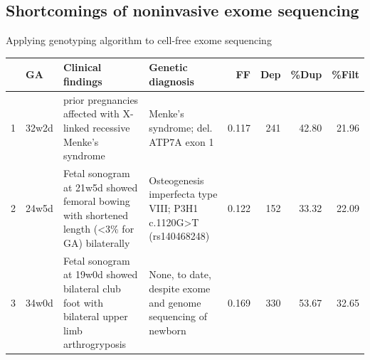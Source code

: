 \documentclass[
  10pt,
  ignorenonframetext,
  m]{beamer}
\begin{document}
\hypertarget{shortcomings-of-noninvasive-exome-sequencing}{%
\subsection{Shortcomings of noninvasive exome
sequencing}\label{shortcomings-of-noninvasive-exome-sequencing}}

\begin{frame}{Applying genotyping algorithm to cell-free exome
sequencing}
\protect\hypertarget{applying-genotyping-algorithm-to-cell-free-exome-sequencing}{}

\scriptsize

\begin{table}
\centering
\begin{tabular}[t]{ll>{\raggedright\arraybackslash}p{8em}>{\raggedright\arraybackslash}p{8em}rrrr}
\toprule
  & GA & Clinical findings & Genetic diagnosis & FF & Dep & \%Dup & \%Filt\\
\midrule
1 & 32w2d & 5 prior pregnancies affected with X-linked recessive Menke's syndrome & Menke's syndrome; del. ATP7A exon 1 & 0.117 & 241 & 42.80 & 21.96\\
2 & 24w5d & Fetal sonogram at 21w5d showed femoral bowing with shortened length (\textless3\% for GA) bilaterally & Osteogenesis imperfecta type VIII; P3H1 c.1120G\textgreater T (rs140468248) & 0.122 & 152 & 33.32 & 22.09\\
3 & 34w0d & Fetal sonogram at 19w0d showed bilateral club foot with bilateral upper limb arthrogryposis & None, to date, despite exome and genome sequencing of newborn & 0.169 & 330 & 53.67 & 32.65\\
\bottomrule
\end{tabular}
\end{table}

\end{frame}
\end{document}
